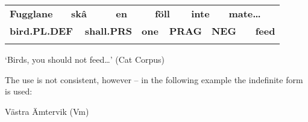 \begin{tabular}{llllllllllll}
\lsptoprule
{\bfseries Fugglane} & \multicolumn{2}{l}{{\bfseries skâ}

} & \multicolumn{2}{l}{{\bfseries en}

} & \multicolumn{2}{l}{{\bfseries föll}

} & \multicolumn{2}{l}{{\bfseries inte}

} & \multicolumn{2}{l}{{\bfseries mate…}

} & \\
\multicolumn{2}{l}{{\bfseries bird.PL.DEF}

} & \multicolumn{2}{l}{{\bfseries shall.PRS}

} & \multicolumn{2}{l}{{\bfseries one}

} & \multicolumn{2}{l}{{\bfseries PRAG}

} & \multicolumn{2}{l}{{\bfseries NEG}

} & \multicolumn{2}{l}{{\bfseries feed}

}\\
\lspbottomrule
\end{tabular}

\begin{styleTranslation}
‘Birds, you should not feed…’ (Cat Corpus)

\end{styleTranslation}

The use is not consistent, however – in the following example the indefinite form is used:


\begin{listWWNumileveli}
\item 

\end{listWWNumileveli}

\begin{listWWNumxixleveli}
\item 

\begin{styleExLtrTbl}
Västra Ämtervik (Vm) 

\end{styleExLtrTbl}

\end{listWWNumxixleveli}

